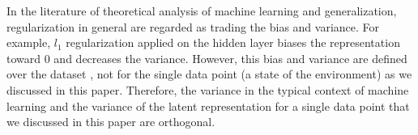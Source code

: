
In the literature of theoretical analysis of machine learning and generalization,
regularization in general are regarded as trading the bias and variance.
For example, $l_1$ regularization applied on the hidden layer biases the representation toward 0 and decreases the variance.
However, this bias and variance are defined over the dataset \cite{deeplearningbook},
not for the single data point (a state of the environment) as we discussed in this paper.
% 
Therefore, the variance in the typical context of machine learning and the variance of the latent representation
for a single data point that we discussed in this paper are orthogonal.



% 

